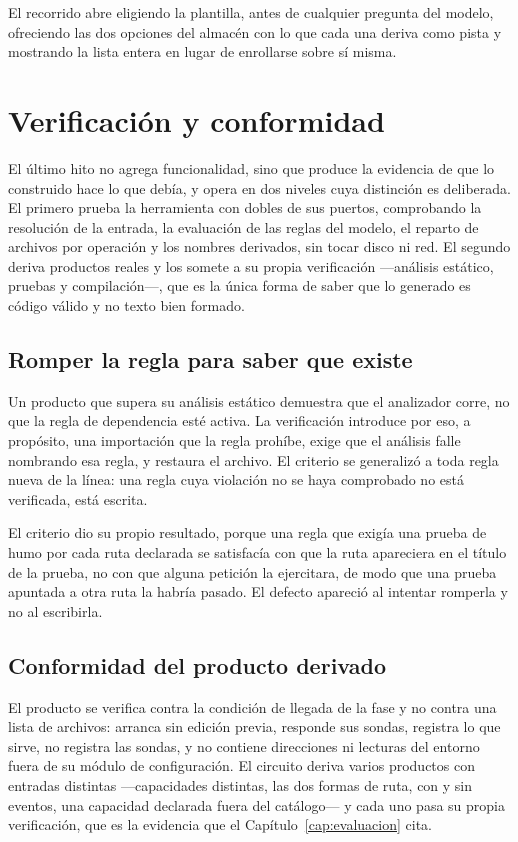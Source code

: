 El recorrido abre eligiendo la plantilla, antes de cualquier pregunta del
modelo, ofreciendo las dos opciones del almacén con lo que cada una deriva
como pista y mostrando la lista entera en lugar de enrollarse sobre sí misma.

\section{Verificación y conformidad}
\label{sec:pruebas-fase-2}

El último hito no agrega funcionalidad, sino que produce la evidencia de que
lo construido hace lo que debía, y opera en dos niveles cuya distinción es
deliberada. El primero prueba la herramienta con dobles de sus puertos,
comprobando la resolución de la entrada, la evaluación de las reglas del
modelo, el reparto de archivos por operación y los nombres derivados, sin
tocar disco ni red. El segundo deriva productos reales y los somete a su
propia verificación —análisis estático, pruebas y compilación—, que es la
única forma de saber que lo generado es código válido y no texto bien
formado.

\subsection{Romper la regla para saber que existe}

Un producto que supera su análisis estático demuestra que el analizador
corre, no que la regla de dependencia esté activa. La verificación introduce
por eso, a propósito, una importación que la regla prohíbe, exige que el
análisis falle nombrando esa regla, y restaura el archivo. El criterio se
generalizó a toda regla nueva de la línea: una regla cuya violación no se
haya comprobado no está verificada, está escrita.

El criterio dio su propio resultado, porque una regla que exigía una prueba de
humo por cada ruta declarada se satisfacía con que la ruta apareciera en el
título de la prueba, no con que alguna petición la ejercitara, de modo que una
prueba apuntada a otra ruta la habría pasado. El defecto apareció al intentar
romperla y no al escribirla.

\subsection{Conformidad del producto derivado}

El producto se verifica contra la condición de llegada de la fase y no contra
una lista de archivos: arranca sin edición previa, responde sus sondas,
registra lo que sirve, no registra las sondas, y no contiene direcciones ni
lecturas del entorno fuera de su módulo de configuración. El circuito deriva
varios productos con entradas distintas —capacidades distintas, las dos
formas de ruta, con y sin eventos, una capacidad declarada fuera del
catálogo— y cada uno pasa su propia verificación, que es la evidencia que el
Capítulo~\ref{cap:evaluacion} cita.

